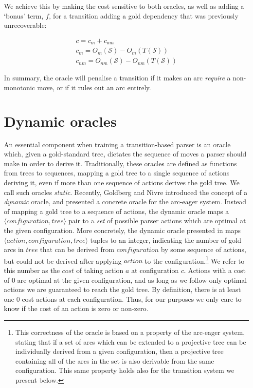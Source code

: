\documentclass[11pt,letterpaper]{article}
\newcommand{\tuple}[1]{$\langle#1\rangle$}
\newcommand{\state}{\mathcal{S}}
\begin{document}
We achieve this by making the cost sensitive to both oracles, as well as adding a
`bonus' term, $f$, for a transition adding a gold dependency that was previously
unrecoverable:

\begin{eqnarray}
c = c_m + c_{nm}\\
c_m = O_m(\state) - O_m(T(\state))\\
c_{nm} = O_{nm}(\state) - O_{nm}(T(\state))
\end{eqnarray}

In summary, the oracle will penalise a transition if it makes an arc \emph{require}
a non-monotonic move, or if it rules out an arc entirely.

\section{Dynamic oracles} 
 
 An essential component when training a transition-based parser is an oracle
 which, given a gold-standard tree, dictates the sequence of moves a parser
 should make in order to derive it.  Traditionally, these oracles are defined
 as functions from trees to sequences, mapping a gold tree to a single sequence
of actions deriving it, even if more than one sequence of actions derives the
gold tree. We call such oracles \emph{static}.  Recently, Goldberg and Nivre
 introduced the concept of a \emph{dynamic} oracle, and
presented a concrete oracle for the arc-eager system.  Instead of mapping a
gold tree to a sequence of actions, the dynamic oracle maps a
\tuple{configuration, tree} pair to a \emph{set} of possible parser actions
which are optimal at the given configuration.  More concretely, the dynamic
oracle presented in \cite{coling2012} maps \tuple{action,configuration,tree}
tuples to an integer, indicating the number of gold arcs in $tree$ that can be
derived from $configuration$ by some sequence of actions, but could not be derived
after applying $action$ to the configuration.\footnote{This correctness of
the oracle is based on a property of the arc-eager system, stating that if a
set of arcs which can be extended to a projective tree can be individually
derived from a given configuration, then a projective tree containing all of
the arcs in the set is also derivable from the same configuration.  This same
property holds also for the transition system we present below.} We refer to
this number as the $cost$ of taking action $a$ at configuration $c$. Actions
with a cost of 0 are optimal at the given configuration, and as long as we
follow only optimal actions we are guaranteed to reach the gold tree.
By definition, there is at least one 0-cost actions at each configuration.
Thus, for our purposes we only care to know if the cost of an action is zero
or non-zero. 
\end{document}
